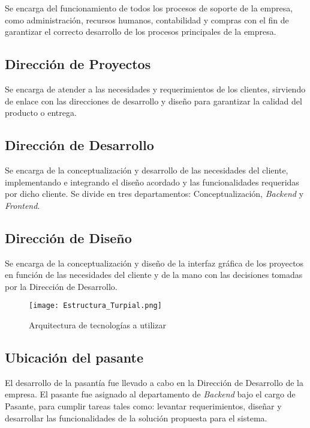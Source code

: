 Se encarga del funcionamiento de todos los procesos de soporte de la empresa,
como administración, recursos humanos, contabilidad y compras con el fin de garantizar el correcto desarrollo de los procesos principales de la empresa.

\subsection*{Dirección de Proyectos}

Se encarga de atender a las necesidades y requerimientos de los clientes, sirviendo de enlace con las direcciones de desarrollo y diseño para garantizar la calidad del producto o entrega.

\subsection*{Dirección de Desarrollo}

Se encarga de la conceptualización y desarrollo de las necesidades del cliente, implementando e integrando el diseño acordado y las funcionalidades requeridas por dicho cliente. Se divide en tres departamentos: Conceptualización, \textit{Backend} y \textit{Frontend}.

\subsection*{Dirección de Diseño}

Se encarga de la conceptualización y diseño de la interfaz gráfica de los proyectos en función de las necesidades del cliente y de la mano con las decisiones tomadas por la Dirección de Desarrollo.

\begin{figure}
\centering
\texttt{[image: Estructura\_Turpial.png]}
\caption{Arquitectura de tecnologías a utilizar}
\label{fig:figura1.1}
\end{figure}

\subsection*{Ubicación del pasante}

El desarrollo de la pasantía fue llevado a cabo en la Dirección de Desarrollo de la empresa. El pasante fue asignado al departamento de \textit{Backend} bajo el cargo de Pasante, para cumplir tareas tales como: levantar requerimientos, diseñar y desarrollar las funcionalidades de la solución propuesta para el sistema.
